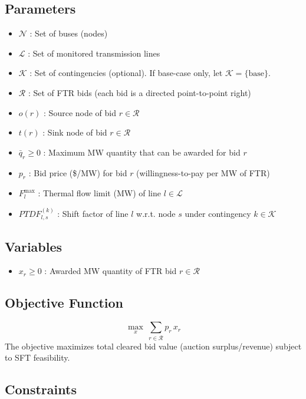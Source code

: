 \documentclass[11pt]{article}
\begin{document}
\subsection {Parameters}
\begin{itemize}
  \item $\mathcal{N}$ : Set of buses (nodes)
  \item $\mathcal{L}$ : Set of monitored transmission lines
  \item $\mathcal{K}$ : Set of contingencies (optional). If base-case only, let $\mathcal{K}=\{\text{base}\}$.
  \item $\mathcal{R}$ : Set of FTR bids (each bid is a directed point-to-point right)
  \item $o(r)$ : Source node of bid $r\in\mathcal{R}$
  \item $t(r)$ : Sink node of bid $r\in\mathcal{R}$
  \item $\bar q_r \ge 0$ : Maximum MW quantity that can be awarded for bid $r$
  \item $p_r$ : Bid price (\$/MW) for bid $r$ (willingness-to-pay per MW of FTR)
  \item $F_l^{\max}$ : Thermal flow limit (MW) of line $l\in\mathcal{L}$
  \item $PTDF^{(k)}_{l,s}$ : Shift factor of line $l$ w.r.t. node $s$ under contingency $k\in\mathcal{K}$

\end{itemize}

\subsection{Variables}
\begin{itemize}
  \item $x_r \ge 0$ : Awarded MW quantity of FTR bid $r\in\mathcal{R}$
\end{itemize}

\subsection{Objective Function}
\begin{equation}
\max_{x}\ \sum_{r\in\mathcal{R}} p_r\,x_r
\tag{1}
\end{equation}
The objective maximizes total cleared bid value (auction surplus/revenue) subject to SFT feasibility.

\subsection{Constraints}
\end{document}
